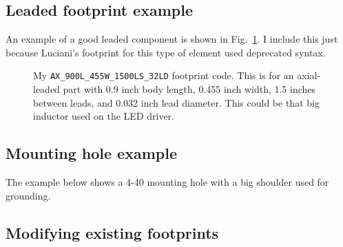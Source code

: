 \subsection{Leaded footprint example}
An example of a good leaded component is shown in Fig.\
\ref{leaded_example}.  I include this just because Luciani's footprint
for this type of element used deprecated syntax.
\begin{figure}[ht]
  \begin{center}
    \begin{minipage}{10cm}
      
    \end{minipage}
    \caption{My \texttt{AX\_900L\_455W\_1500LS\_32LD} footprint code.
      This is for an axial-leaded part with 0.9 inch body length,
      0.455 inch width, 1.5 inches between leads, and 0.032 inch lead
      diameter.  This could be that big inductor used on the LED
      driver.\label{leaded_example}}
  \end{center}
\end{figure}

\subsection{Mounting hole example}
The example below shows a 4-40 mounting hole with a big shoulder used for grounding.



\clearpage
\subsection{Modifying existing footprints}

